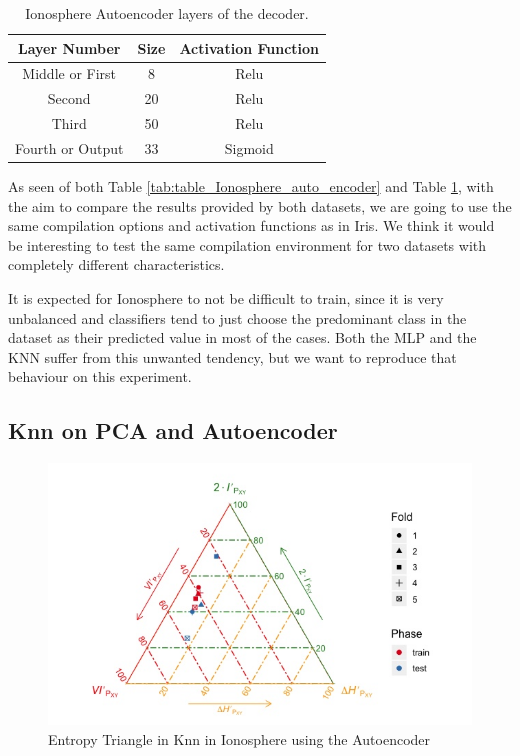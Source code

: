 \documentclass[12pt]{report}
\begin{document}
\begin{table}[H]
	\caption{Ionosphere Autoencoder layers of the decoder.}
	\begin{center}
	\label{tab:table_Ionosphere_auto_decoder}
		\begin{tabular}{c|c|c} %
			\textbf{Layer Number} & \textbf{Size} & \textbf{Activation Function} \\
			\hline
			Middle or First & 8 & Relu\\
			Second & 20 & Relu\\
			Third & 50 & Relu\\
			Fourth or Output & 33 & Sigmoid\\
		\end{tabular}
	\end{center}
\end{table}

As seen of both Table \ref{tab:table_Ionosphere_auto_encoder} and Table \ref{tab:table_Ionosphere_auto_decoder}, with the aim to compare the results provided by both datasets, we are going to use the same compilation options and activation functions as in Iris. We think it would be interesting to test the same compilation environment for two datasets with completely different characteristics.\par

It is expected for Ionosphere to not be difficult to train, since it is very unbalanced and classifiers tend to just choose the predominant class in the dataset as their predicted value in most of the cases. Both the MLP and the KNN suffer from this unwanted tendency, but we want to reproduce that behaviour on this experiment.

\subsection{Knn on PCA and Autoencoder}


\begin{figure}[H]
	\centering
	\includegraphics[width=1\linewidth]{Figuras_tfg/ET_knn_Ionosphere_auto}
	\caption{Entropy Triangle in Knn in Ionosphere using the Autoencoder}
	\label{fig:figure_Knn_Ionosphere_ET_Auto}
\end{figure}
\end{document}
